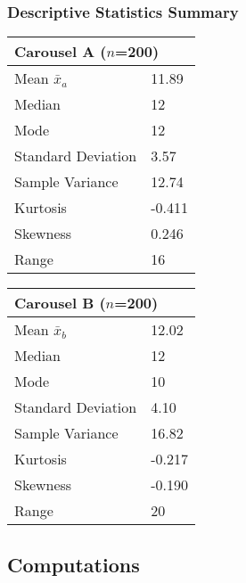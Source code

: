 \documentclass[11pt]{article}
\begin{document}
\subsubsection{Descriptive Statistics Summary}
\begin{table}[h]
\centering
\begin{tabular}{@{}lll@{}}
\toprule
\multicolumn{3}{l}{\textbf{Carousel A ($n$=200)}}         \\ \midrule
Mean $\bar{x}_a$                       & \multicolumn{2}{l}{11.89}  \\
Median                     & \multicolumn{2}{l}{12}     \\
Mode                       & \multicolumn{2}{l}{12}     \\
Standard Deviation         & \multicolumn{2}{l}{3.57}   \\
Sample Variance            & \multicolumn{2}{l}{12.74}  \\
Kurtosis                   & \multicolumn{2}{l}{-0.411} \\
Skewness                   & \multicolumn{2}{l}{0.246}  \\
Range                      & \multicolumn{2}{l}{16}     \\ \bottomrule
\end{tabular}
\qquad
\begin{tabular}{@{}lll@{}}
\toprule
\multicolumn{3}{l}{\textbf{Carousel B ($n$=200)}}         \\ \midrule
Mean $\bar{x}_b$                      & \multicolumn{2}{l}{12.02}  \\
Median                     & \multicolumn{2}{l}{12}     \\
Mode                       & \multicolumn{2}{l}{10}     \\
Standard Deviation         & \multicolumn{2}{l}{4.10}   \\
Sample Variance            & \multicolumn{2}{l}{16.82}  \\
Kurtosis                   & \multicolumn{2}{l}{-0.217} \\
Skewness                   & \multicolumn{2}{l}{-0.190} \\
Range                      & \multicolumn{2}{l}{20}     \\ \bottomrule
\end{tabular}
\end{table}
\newpage
\subsection{Computations}
\end{document}
